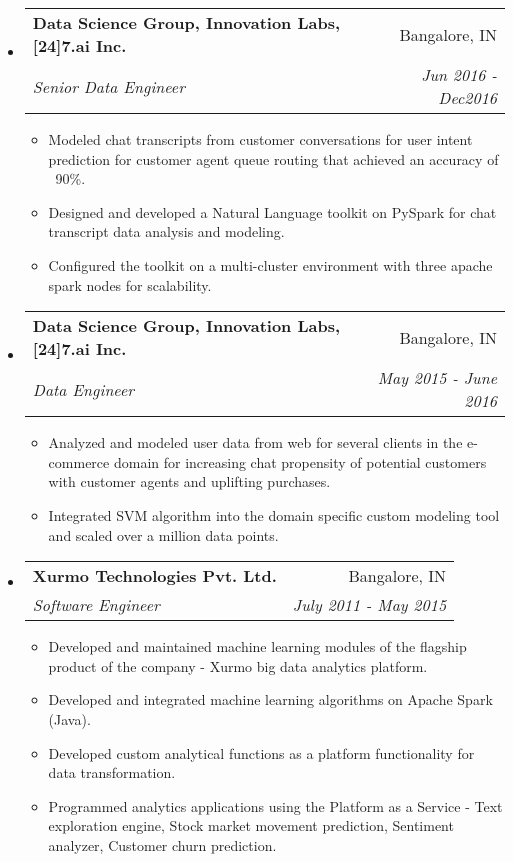 \documentclass[letterpaper,10pt]{article}
\makeatletter
\newcommand{\resumeBullet}[2]{
  \item\small{
    \textbf{#1}{#2 \vspace{-2pt}}
  }
}
\newcommand{\resumeSubheading}[4]{
  \vspace{-1pt}\item
    \begin{tabular*}{0.97\textwidth}{l@{\extracolsep{\fill}}r}
      \textbf{#1} & #2 \\
      \textit{\small#3} & \textit{\small #4} \\
    \end{tabular*}\vspace{-5pt}
}
\newcommand{\resumeJobFunc}[2]{\resumeBullet{#1}{#2}\vspace{-0pt}}
\newcommand{\resumeSubHeadingListStart}{\begin{itemize}[leftmargin=*]}
\newcommand{\resumeSubHeadingListEnd}{\end{itemize}}
\newcommand{\resumeItemListStart}{\begin{itemize}}
\newcommand{\resumeItemListEnd}{\end{itemize}\vspace{-5pt}}
\makeatother
\begin{document}
\resumeSubHeadingListStart      
    \resumeSubheading
      {Data Science Group, Innovation Labs, [24]7.ai Inc.}{Bangalore, IN}
      {Senior Data Engineer}{Jun 2016 - Dec2016}
      \resumeItemListStart      
      \resumeJobFunc{}{Modeled chat transcripts from customer conversations for user intent prediction for customer agent queue routing that achieved an accuracy of ~90\%.}
      \resumeJobFunc{}{Designed and developed a Natural Language toolkit on PySpark for chat transcript data analysis and modeling.}
      \resumeJobFunc{}{Configured the toolkit on a multi-cluster environment with three apache spark nodes for scalability.}
      \resumeItemListEnd      
    \resumeSubHeadingListEnd        
      
\resumeSubHeadingListStart
    \resumeSubheading
      {Data Science Group, Innovation Labs, [24]7.ai Inc.}{Bangalore, IN}
      {Data Engineer}{May 2015 - June 2016}
      \resumeItemListStart            
       \resumeJobFunc{}{Analyzed and modeled user data from web for several clients in the e-commerce domain for increasing chat propensity of potential customers with customer agents and uplifting purchases.}
       \resumeJobFunc{}{Integrated SVM algorithm into the domain specific custom modeling tool and scaled over a million data points.}
      \resumeItemListEnd             
      \resumeSubHeadingListEnd        

\resumeSubHeadingListStart      
    \resumeSubheading
      {Xurmo Technologies Pvt. Ltd.}{Bangalore, IN}
      {Software Engineer}{July 2011 - May 2015}
      \resumeItemListStart            
       \resumeJobFunc{}{Developed and maintained machine learning modules of the flagship product of the company - Xurmo big data analytics platform.}
       \resumeJobFunc{}{Developed and integrated machine learning algorithms on Apache Spark (Java).}
       \resumeJobFunc{}{Developed custom analytical functions as a platform functionality for data transformation.}
       \resumeJobFunc{}{Programmed analytics applications using the Platform as a Service - Text exploration engine, Stock market movement prediction, Sentiment analyzer, Customer churn prediction.}
      \resumeItemListEnd             
      \resumeSubHeadingListEnd        


%


\end{document}
